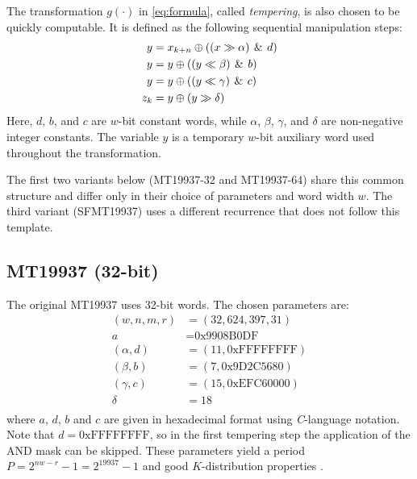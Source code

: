 \documentclass[preprint,1p,times]{elsarticle}
\begin{document}
The transformation $g(\cdot)$ in \eqref{eq:formula}, called \textit{tempering}, is also chosen to be quickly computable. It is defined as the following sequential manipulation steps:
\begin{equation}
\label{eq:tempering}
\begin{aligned}
y &= x_{k+n} \oplus ((x\gg \alpha)\!\And\! d)\\
y &= y \oplus ((y\ll \beta)\!\And \!b)\\
y &= y \oplus ((y\ll \gamma)\!\And \!c)\\
z_k &= y \oplus (y\gg \delta)
\end{aligned}
\end{equation}
Here, $d$, $b$, and $c$ are $w$-bit constant words, while $\alpha$, $\beta$, $\gamma$, and $\delta$ are non-negative integer constants. The variable $y$ is a temporary $w$-bit auxiliary word used throughout the transformation.

The first two variants below (MT19937-32 and MT19937-64) share this common structure and differ only in their choice of parameters and word width $w$. The third variant (SFMT19937) uses a different recurrence that does not follow this template.

\subsection{MT19937 (32-bit)}
\label{sec:mt32}
The original MT19937 \cite{mt19937} uses 32-bit words.
The chosen parameters are:
\begin{equation}
\label{eq:params}
\begin{aligned}
(w, n, m, r) &= (32, 624, 397, 31)\\
a &= \text{0x9908B0DF}\\
(\alpha, d) &= (11, \text{0xFFFFFFFF})\\
(\beta, b) &= (7, \text{0x9D2C5680})\\
(\gamma, c) &= (15, \text{0xEFC60000})\\
\delta &= 18\\
\end{aligned}
\end{equation}
where $a$, $d$, $b$ and $c$ are given in hexadecimal format using \textit{C}-language notation.
Note that $d = \text{0xFFFFFFFF}$, so in the first tempering step the application of the AND mask can be skipped.
These parameters yield a period $P=2^{nw-r}\!-\!1=2^{19937}\!-\!1$ and good $K$-distribution properties \cite{mt19937}.
\end{document}
